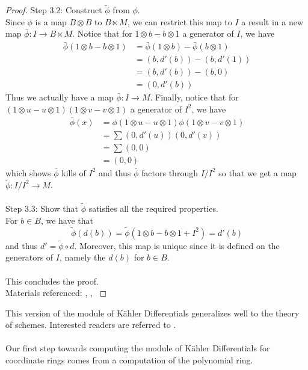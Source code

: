 \documentclass[a4paper]{article}
\begin{document}
\begin{prp}{}{}
\begin{proof}
Step 3.2: Construct $\tilde{\phi}$ from $\phi$. \\
Since $\phi$ is a map $B\otimes B$ to $B\ltimes M$, we can restrict this map to $I$ a result in a new map $\bar{\phi}:I\to B\ltimes M$. Notice that for $1\otimes b-b\otimes 1$ a generator of $I$, we have 
\begin{align*}
\bar{\phi}(1\otimes b-b\otimes 1)&=\bar{\phi}(1\otimes b)-\bar{\phi}(b\otimes 1)\\
&=(b,d'(b))-(b,d'(1))\\
&=(b,d'(b))-(b,0)\\
&=(0,d'(b))
\end{align*}
Thus we actually have a map $\bar{\phi}:I\to M$. Finally, notice that for $(1\otimes u-u\otimes 1)(1\otimes v-v\otimes 1)$ a generator of $I^2$, we have 
\begin{align*}
\bar{\phi}(x)&=\phi(1\otimes u-u\otimes 1)\phi(1\otimes v-v\otimes 1)\\
&=\sum(0,d'(u))(0,d'(v))\\
&=\sum(0,0)\tag{Mult. in Trivial Extension}\\
&=(0,0)
\end{align*}
which shows $\bar{\phi}$ kills of $I^2$ and thus $\bar{\phi}$ factors through $I/I^2$ so that we get a map $\tilde{\phi}:I/I^2\to M$. \\~\\

Step 3.3: Show that $\tilde{\phi}$ satisfies all the required properties. \\
For $b\in B$, we have that $$\tilde{\phi}(d(b))=\tilde{\phi}(1\otimes b-b\otimes 1+I^2)=d'(b)$$ and thus $d'=\tilde{\phi}\circ d$. Moreover, this map is unique since it is defined on the generators of $I$, namely the $d(b)$ for $b\in B$. \\~\\

This concludes the proof. \\
Materials referenced: \cite{Rav}, \cite{Ern}, \cite{Mat}
\end{proof}
\end{prp}

This version of the module of Kähler Differentials generalizes well to the theory of schemes. Interested readers are referred to \cite{Har}. \\~\\

Our first step towards computing the module of Kähler Differentials for coordinate rings comes from a computation of the polynomial ring. 
\end{document}
